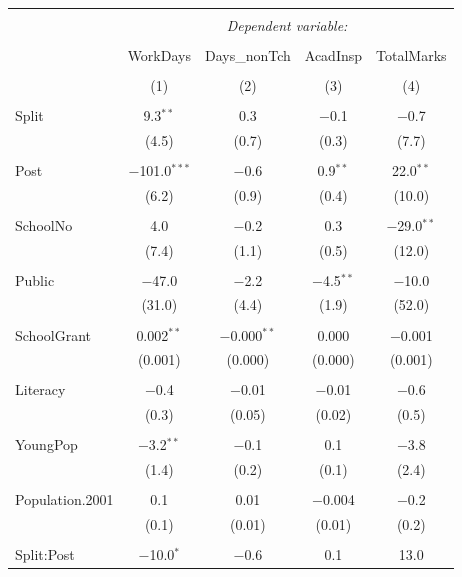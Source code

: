\documentclass[12pt, a4paper]{article}
\begin{document}
\begin{table}[!htbp] \centering 
  \caption{} 
  \label{} 
\begin{tabular}{@{\extracolsep{5pt}}lcccc} 
\\[-1.8ex]\hline 
\hline \\[-1.8ex] 
 & \multicolumn{4}{c}{\textit{Dependent variable:}} \\ 
\cline{2-5} 
\\[-1.8ex] & WorkDays & Days\_nonTch & AcadInsp & TotalMarks \\ 
\\[-1.8ex] & (1) & (2) & (3) & (4)\\ 
\hline \\[-1.8ex] 
 Split & 9.3$^{**}$ & 0.3 & $-$0.1 & $-$0.7 \\ 
  & (4.5) & (0.7) & (0.3) & (7.7) \\ 
  & & & & \\ 
 Post & $-$101.0$^{***}$ & $-$0.6 & 0.9$^{**}$ & 22.0$^{**}$ \\ 
  & (6.2) & (0.9) & (0.4) & (10.0) \\ 
  & & & & \\ 
 SchoolNo & 4.0 & $-$0.2 & 0.3 & $-$29.0$^{**}$ \\ 
  & (7.4) & (1.1) & (0.5) & (12.0) \\ 
  & & & & \\ 
 Public & $-$47.0 & $-$2.2 & $-$4.5$^{**}$ & $-$10.0 \\ 
  & (31.0) & (4.4) & (1.9) & (52.0) \\ 
  & & & & \\ 
 SchoolGrant & 0.002$^{**}$ & $-$0.000$^{**}$ & 0.000 & $-$0.001 \\ 
  & (0.001) & (0.000) & (0.000) & (0.001) \\ 
  & & & & \\ 
 Literacy & $-$0.4 & $-$0.01 & $-$0.01 & $-$0.6 \\ 
  & (0.3) & (0.05) & (0.02) & (0.5) \\ 
  & & & & \\ 
 YoungPop & $-$3.2$^{**}$ & $-$0.1 & 0.1 & $-$3.8 \\ 
  & (1.4) & (0.2) & (0.1) & (2.4) \\ 
  & & & & \\ 
 Population.2001 & 0.1 & 0.01 & $-$0.004 & $-$0.2 \\ 
  & (0.1) & (0.01) & (0.01) & (0.2) \\ 
  & & & & \\ 
 Split:Post & $-$10.0$^{*}$ & $-$0.6 & 0.1 & 13.0 \\ 

\end{tabular}
\end{table}
\end{document}
